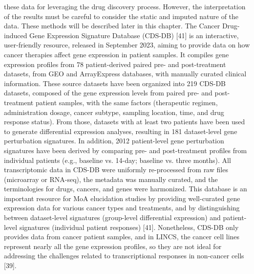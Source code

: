 these data for leveraging the drug discovery process. However, the interpretation of the results must be careful to consider the static and imputed nature of the data. These methods will be described later in this chapter. 
The Cancer Drug-induced Gene Expression Signature Database (CDS-DB) [41] is an interactive, user-friendly resource, released in September 2023, aiming to provide data on how cancer therapies affect gene expression in patient samples. It compiles gene expression profiles from 78 patient-derived paired pre- and post-treatment datasets, from GEO and ArrayExpress databases, with manually curated clinical information. These source datasets have been organized into 219 CDS-DB datasets, composed of the gene expression levels from paired pre- and post-treatment patient samples, with the same factors (therapeutic regimen, administration dosage, cancer subtype, sampling location, time, and drug response status). From those, datasets with at least two patients have been used to generate differential expression analyses, resulting in 181 dataset-level gene perturbation signatures. In addition, 2012 patient-level gene perturbation signatures have been derived by comparing pre- and post-treatment profiles from individual patients (e.g., baseline vs. 14-day; baseline vs. three months). All transcriptomic data in CDS-DB were uniformly re-processed from raw files (microarray or RNA-seq), the metadata was manually curated, and the terminologies for drugs, cancers, and genes were harmonized. This database is an important resource for MoA elucidation studies by providing well-curated gene expression data for various cancer types and treatments, and by distinguishing between dataset-level signatures (group-level differential expression) and patient-level signatures (individual patient responses) [41]. Nonetheless, CDS-DB only provides data from cancer patient samples, and in LINCS, the cancer cell lines represent nearly all the gene expression profiles, so they are not ideal for addressing the challenges related to transcriptional responses in non-cancer cells [39].
